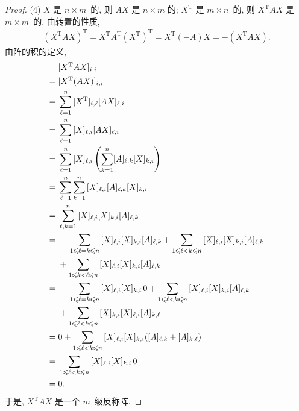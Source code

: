 \documentclass[../libro.tex]{subfiles}
\begin{document}
\begin{proof}
    (4)
    \(X\) 是 \(n \times m\)~的, 则 \(AX\) 是 \(n \times m\) 的;
    \(X^{\mathrm{T}}\) 是 \(m \times n\)~的,
    则 \(X^{\mathrm{T}} A X\) 是 \(m \times m\)~的.
    由转置的性质,
    \begin{align*}
        (X^{\mathrm{T}} A X)^{\mathrm{T}}
        = X^{\mathrm{T}} A^{\mathrm{T}} (X^{\mathrm{T}})^{\mathrm{T}}
        = X^{\mathrm{T}} (-A) X
        = -(X^{\mathrm{T}} A X).
    \end{align*}
    由阵的积的定义,
    \begin{align*}
        &
        [X^{\mathrm{T}} A X]_{i,i}
        \\
        = {} &
        [X^{\mathrm{T}} (A X)]_{i,i}
        \\
        = {} &
        \sum_{\ell = 1}^{n}
        {[X^{\mathrm{T}}]_{i,\ell} [A X]_{\ell,i}}
        \\
        = {} &
        \sum_{\ell = 1}^{n}
        {[X]_{\ell,i} [A X]_{\ell,i}}
        \\
        = {} &
        \sum_{\ell = 1}^{n}
        {
            [X]_{\ell,i}
            \left(\sum_{k = 1}^{n} [A]_{\ell,k} [X]_{k,i}\right)
        }
        \\
        = {} &
        \sum_{\ell = 1}^{n}
        \sum_{k = 1}^{n}
        {[X]_{\ell,i} [A]_{\ell,k} [X]_{k,i}}
        \\
        = {} &
        \sum_{\ell, k = 1}^{n}
        {[X]_{\ell,i} [X]_{k,i} [A]_{\ell,k}}
        \\
        = {} & \hphantom{{} + {}}
        \sum_{1 \leq \ell = k \leq n}
        {[X]_{\ell,i} [X]_{k,i} [A]_{\ell,k}}
        +
        \sum_{1 \leq \ell < k \leq n}
        {[X]_{\ell,i} [X]_{k,i} [A]_{\ell,k}}
        \\
        & +
        \sum_{1 \leq k < \ell \leq n}
        {[X]_{\ell,i} [X]_{k,i} [A]_{\ell,k}}
        \\
        = {} & \hphantom{{} + {}}
        \sum_{1 \leq \ell = k \leq n}
        {[X]_{\ell,i} [X]_{k,i}\, 0}
        +
        \sum_{1 \leq \ell < k \leq n}
        {[X]_{\ell,i} [X]_{k,i} [A]_{\ell,k}}
        \\
        & +
        \sum_{1 \leq \ell < k \leq n}
        {[X]_{k,i} [X]_{\ell,i} [A]_{k,\ell}}
        \\
        = {} &
        0 +
        \sum_{1 \leq \ell < k \leq n}
        {[X]_{\ell,i} [X]_{k,i} ([A]_{\ell,k} + [A]_{k,\ell})}
        \\
        = {} &
        \sum_{1 \leq \ell < k \leq n}
        {[X]_{\ell,i} [X]_{k,i}\, 0}
        \\
        = {} &
        0.
    \end{align*}
    于是, \(X^{\mathrm{T}} A X\) 是一个 \(m\)~级反称阵.
\end{proof}
\end{document}

